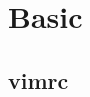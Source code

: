\documentclass[a4paper,10pt,twocolumn,oneside]{article}
\begin{document}
\pagestyle{fancy}
\fancyfoot{}
\fancyhead[R]{\thepage}
\renewcommand{\headrulewidth}{0.4pt}
\renewcommand{\contentsname}{Contents} 

\scriptsize
\tableofcontents

\newpage

\section{Basic}

\subsection{vimrc}

\end{document}
